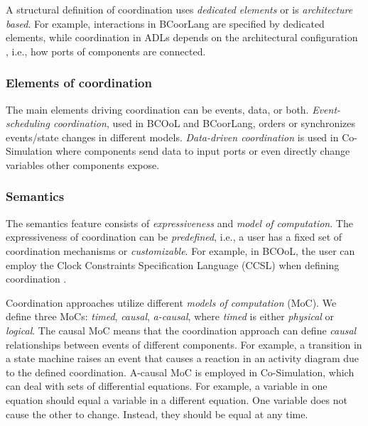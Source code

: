 \documentclass[runningheads]{llncs}
\begin{document}
A structural definition of coordination uses \textit{dedicated elements} or is \textit{architecture based}.
For example, interactions in BCoorLang are specified by dedicated elements, while coordination in ADLs depends on the architectural configuration \cite{medvidovicClassificationComparisonFramework2000}, i.e., how ports of components are connected.

\subsubsection{Elements of coordination} The main elements driving coordination can be events, data, or both.
\textit{Event-scheduling coordination}, used in BCOoL and BCoorLang, orders or synchronizes events/state changes in different models.
\textit{Data-driven coordination} is used in Co-Simulation where components send data to input ports or even directly change variables other components expose.

\subsubsection{Semantics} The semantics feature consists of \textit{expressiveness} and \textit{model of computation}.
The expressiveness of coordination can be \textit{predefined}, i.e., a user has a fixed set of coordination mechanisms or \textit{customizable}.
For example, in BCOoL, the user can employ the Clock Constraints Specification Language (CCSL) \cite{andreSyntaxSemanticsClock2009} when defining coordination \cite{varalarsenBCOolBehavioralCoordination2016,varalarsenBehavioralCoordinationOperator2015}.

Coordination approaches utilize different \textit{models of computation} (MoC).
We define three MoCs: \textit{timed}, \textit{causal}, \textit{a-causal}, where \textit{timed} is either \textit{physical} or \textit{logical}.
The causal MoC means that the coordination approach can define \textit{causal} relationships between events of different components.
For example, a transition in a state machine raises an event that causes a reaction in an activity diagram due to the defined coordination.
A-causal MoC is employed in Co-Simulation, which can deal with sets of differential equations.
For example, a variable in one equation should equal a variable in a different equation.
One variable does not cause the other to change.
Instead, they should be equal at any time.
\end{document}
